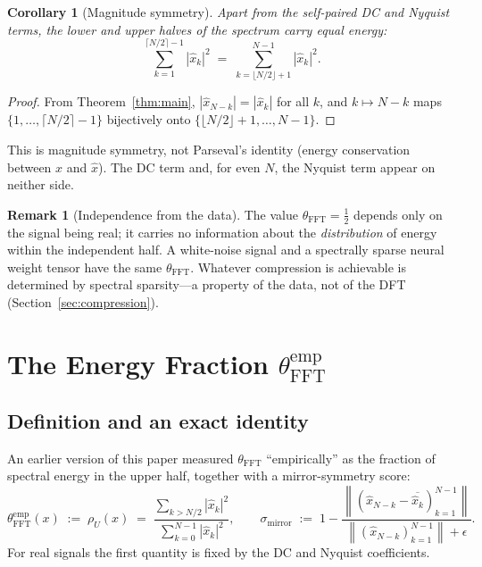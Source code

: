 \documentclass[12pt]{article}
\newtheorem{corollary}[theorem]{Corollary}
\theoremstyle{definition}
\newtheorem{remark}[theorem]{Remark}
\newcommand{\norm}[1]{\left\|#1\right\|}
\newcommand{\abs}[1]{\left|#1\right|}
\newcommand{\thetaFFT}{\theta_{\mathrm{FFT}}}
\begin{document}
\begin{corollary}[Magnitude symmetry]\label{cor:energy}
Apart from the self-paired DC and Nyquist terms, the lower and upper
halves of the spectrum carry equal energy:
\[
  \sum_{k=1}^{\lceil N/2 \rceil - 1} \abs{\hat{x}_k}^2
  \;=\;
  \sum_{k=\lfloor N/2 \rfloor + 1}^{N-1} \abs{\hat{x}_k}^2.
\]
\end{corollary}

\begin{proof}
From Theorem~\ref{thm:main}, $\abs{\hat{x}_{N-k}} = \abs{\hat{x}_k}$
for all $k$, and $k \mapsto N-k$ maps
$\{1, \ldots, \lceil N/2 \rceil - 1\}$ bijectively onto
$\{\lfloor N/2 \rfloor + 1, \ldots, N-1\}$.
\end{proof}

This is magnitude symmetry, not Parseval's identity (energy
conservation between $x$ and $\hat{x}$).  The DC term and, for even $N$,
the Nyquist term appear on neither side.

\begin{remark}[Independence from the data]\label{rem:entropy}
The value $\thetaFFT = \tfrac{1}{2}$ depends only on the signal being
real; it carries no information about the \emph{distribution} of energy
within the independent half.  A white-noise signal and a spectrally
sparse neural weight tensor have the same $\thetaFFT$.  Whatever
compression is achievable is determined by spectral sparsity---a
property of the data, not of the DFT (Section~\ref{sec:compression}).
\end{remark}

\section{The Energy Fraction $\thetaFFT^{\mathrm{emp}}$}
\label{sec:empirical}

\subsection{Definition and an exact identity}

An earlier version of this paper measured $\thetaFFT$ ``empirically''
as the fraction of spectral energy in the upper half, together with a
mirror-symmetry score:
\[
  \thetaFFT^{\mathrm{emp}}(x) \;:=\; \rho_U(x) \;=\;
  \frac{\sum_{k > N/2} \abs{\hat{x}_k}^2}
       {\sum_{k=0}^{N-1} \abs{\hat{x}_k}^2},
  \qquad
  \sigma_{\mathrm{mirror}} \;:=\; 1 - \frac{\norm{(\hat{x}_{N-k} - \overline{\hat{x}_k})_{k=1}^{N-1}}}
       {\norm{(\hat{x}_{N-k})_{k=1}^{N-1}} + \epsilon}.
\]
For real signals the first quantity is fixed by the DC and Nyquist
coefficients.
\end{document}
